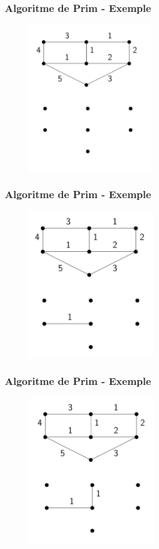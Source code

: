 \documentclass{beamer}
\begin{document}
\begin{frame}
\frametitle{Algoritme de Prim - Exemple}
\begin{figure}[h]
 \label{fig:volum}
\centering
\includegraphics[height=6.5cm]{prim1}
\end{figure}
\end{frame}

\begin{frame}
\frametitle{Algoritme de Prim - Exemple}
\begin{figure}[h]
 \label{fig:volum}
\centering
\includegraphics[height=6.5cm]{prim2}
\end{figure}
\end{frame}
\begin{frame}
\frametitle{Algoritme de Prim - Exemple}
\begin{figure}[h]
 \label{fig:volum}
\centering
\includegraphics[height=6.5cm]{prim3}
\end{figure}
\end{frame}
\end{document}
